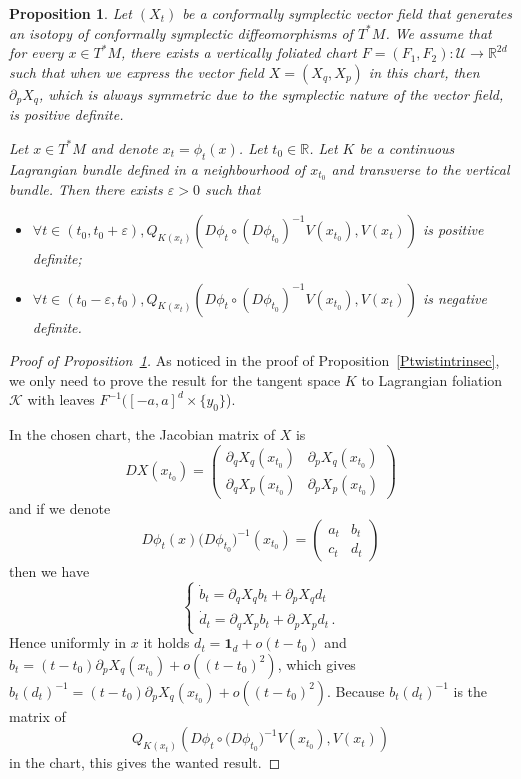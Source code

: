 \documentclass[10pt,a4paper]{amsart}
\numberwithin{equation}{section}
\newcommand*\cU{\mathcal{U}}
\newcommand*\cal{\mathcal}
\newcommand{\bfone}{\mathbf{1}}
\newcommand*\R{\mathbb{R}}
\let\oldforall\forall
\renewcommand*{\forall}{\mathrel{\oldforall}}
\newtheorem{prop}[theo]{Proposition}
\theoremstyle{definition}
\theoremstyle{remark}
\begin{document}
\begin{prop}\label{Ptermchpvect}
Let $(X_t)$ be a conformally symplectic vector field that generates an isotopy of conformally symplectic diffeomorphisms of $T^*M$. We assume that for every $x\in T^*M$, there exists a vertically foliated chart $F=(F_1, F_2):\cU\to \R^{2d}$ such that when we express the vector field $X=(X_q, X_p)$ in this chart, then $\partial_pX_q$, which is always symmetric due to the symplectic nature of the vector field, is positive definite.



Let $x\in T^*M$ and denote $x_t=\phi_t(x)$. Let $t_0\in\R$. Let $K$ be a continuous Lagrangian bundle defined in a neighbourhood of $x_{t_0}$ and transverse to the vertical bundle. Then there exists $\varepsilon>0$ such that
\begin{itemize}
\item $\forall t\in (t_0, t_0+\varepsilon), Q_{K(x_t)}(D\phi_t\circ (D\phi_{t_0})^{-1}V(x_{t_0}), V(x_t))$ is positive definite;
\item $\forall t\in (t_0-\varepsilon, t_0), Q_{K(x_t)}(D\phi_t\circ (D\phi_{t_0})^{-1}V(x_{t_0}), V(x_t))$ is negative definite.
\end{itemize}
\end{prop}

\begin{proof}[Proof of Proposition~\ref{Ptermchpvect}]
As noticed in the proof of Proposition~\ref{Ptwistintrinsec}, we only need to prove the result for the tangent space $K$ to Lagrangian foliation ${\cal K}$ with leaves $F^{-1}([-a, a]^d\times \{y_0\}$).

In the chosen chart, the Jacobian matrix of $X$ is
\[
DX(x_{t_0})=
\begin{pmatrix}\partial_qX_q(x_{t_0})&\partial_pX_q(x_{t_0})\\
\partial_qX_p(x_{t_0})&\partial_pX_p(x_{t_0})
\end{pmatrix}
\]
and if we denote
\[
D\phi_t(x) \big(D\phi_{t_0}\big)^{-1}(x_{t_0})=
\begin{pmatrix}a_t&b_t\\ c_t&d_t
\end{pmatrix}
\]
then we have
\begin{equation}\label{Ehamlin}
\begin{cases}
\dot b_t=\partial_qX_qb_t+\partial_pX_qd_t\\
\dot d_t=\partial_qX_pb_t+\partial_pX_pd_t\,.
\end{cases}
\end{equation}
Hence uniformly in $x$ it holds $d_t= \bfone_d+o(t-t_0)$ and $b_t=(t-t_0)\partial_pX_q(x_{t_0})+o((t-t_0)^2)$, which gives $b_t(d_t)^{-1}= (t-t_0)\partial_pX_q(x_{t_0})+o((t-t_0)^2)$. Because $b_t(d_t)^{-1}$ is the matrix of
\[
Q_{K(x_t)}\left(D\phi_t\circ \big(D\phi_{t_0}\big)^{-1}V(x_{t_0}), V(x_t)\right)
\]
in the chart, this gives the wanted result.
\end{proof}
\end{document}

